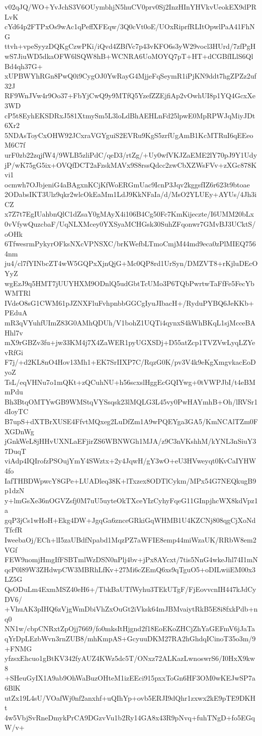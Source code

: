 v02qJQ/WO+YvJchS3V6OUymbhjN5huCV0prv0Sj2InzHInYHVkvUeokEX9dPRLvK
cYd64p2FTPxOs9wAc1qPeffXFEqw/3Q0cVt0oE/UOxRiprfRLItOpwlPaA41FhNG
ttvh+vpeSyyzDQKgCzwPKi/iQvd4ZBfVc7p43vKFO6s3yW29vocl3HUrd/7zfPgH
wS7JiuWD5dkaOFW6lSQW8hB+WCNRA6UoMOYQ7pT+HT+dCGBfILlS6QlBd4qh37G+
xUPBWYhRGn8PwQ0i9CygOJ0YwRayG4MjjeFqSeymR1iPjKN9ddt7hgZPZz2uf32J
RF9WnJVw4r9Oo37+FbYjCwQ9y9MTfQ5YzefZZEjfiAp2vOwhUI8p1YQ4GcxXe3WD
cP5t8EyhEKSDRxJ581XtmySm5L3loLdBhAEHLnFd25lpwE0MpRPWJqMiyJDt6Xr2
5NDAsToyCxOHW92JCxraVGYguiS2EVRu9KgS5zrfUgAmB1KcMTRuI6qEEeoM6C7f
urF0zb22zqjfW4/9WLB5zliPdC/qeD3/rtZg/+Uy0wfVKJZaEME2lY70pJ9Y1Udy
jP/wK75gG5ix+OVQfDCT2aFzskMAVx9S8rssQdcc2zwCbXZWsFVv+zXGc878Kvi1
ocmwh7OJbjeniG4aBAgxnKCjKfWoERGmUac9IcnP3Jqv2kggsfIZ6r623t9btoae
2ODabsIKT3Ulz9qkr2wlcOkEaMm1LdJ9KkNFaIa/d/MsO2YLUEy+AYUs/4Jh3iCZ
x7Z7t7EgIUahbnQlC1dZsaY0gMAyX4i106B4Cg50Fc7KmKijeczte/I6UMM20bLx
0vVfywQuzcbaF/UqNLXMcey0YXSyaMCHGsk30SuhZFqonwr7GMvBJ3UCktS/oOHk
6TfwesrmPykyrOFksNXcVPNSXC/brKWefbLTmoCmjM44md9eca0zPlMIEQ7564nm
ju4/cl7fYINbcZT4wW5GQPxXjnQjG+Mc0QP8rd1UrSyn/DMZVT8+rKjluDEcOYyZ
wgEzJ9q5HMT7jUUYHXM9ODnlQ5udGbtTcUMo3P6TQbPwrtwTaFfFe5FecYbWMTRl
IVdeO8sG1CWM61pJZNXFluFvhpnbbGGCgIyuJIbacH+/RyduPYBQ6JeKKb+PEduA
mR3qVYuhfUImZ83G0AMhQDUh/V1bohZ1UQTi4qynxS4kWhBKqL1sjMcceBAHhl7v
mX9rGBZv3fu+jw33KM4j7X4ZaWER1pyUGXSDj+D55atZcp1TVZVwLyqLZYevRfGi
F7j/+d2KL8nO4Hov13Mh1+EK7SrIIXP7C/RqzG0K/pv3V4k9eKgXmgvkacEoDyoZ
TsL/eqVHNu7o1mQKt+zQCuhNU+h56scxslHggEcGQIYwg+0tVWPJbI/t4eBMmPdu
Bh3BtqOMTYwGB9WMStqVYSsqsk23lMQLG3L45vy0PwHAYmhB+Oh/lRVSr1dIoyTC
B7upS+dXTBrXUSE4FfvtMQxeg2LuDfZm1A9wPQEYga3GA5/KmNCAlTZm0FXGDnWg
jGnkWeL8jHHvUXNLaEFjirZS6WBNWGh1MJA/z9C3nVKshhM/kYNL3nSiuY37DuqT
viAdp4IQIrofzPSOujYmY4SWztx+2y4JqwH/gY3wO+eU3HVweyqt0KvCaIYHW4fo
IafTHBDWpwcY8GPe+LUADleq38K+lTxzex8ODTlCykm/MPx54G7NEQkugB9p1dzN
y+lmGsXe36nOGVZsfj0M7uU5uyteOkTXceYIzCyhyFqeG11GInpjhcWX8kdVpz1a
gqP3jCs1wHoH+Ekg4DW+JgqGa6znceGRkiGqWHMB1U4KZCNj808qgCjXoNdTfcfR
IweebaOj/ECh+lI5zaUBdfNpabd1MqzPZ7aWFIE8emp44miWzaUK/RRbW8em2VGf
FEW9nomjHmgIfFSBTmlWzDSN0nPlj4bv+jPx8AYcxt/7tis5NnG4wkeJhl74I1mN
qcP0l89W3ZHdwpCW3MBRhLfKv+27Mi6cZEmQ6xs9qTguO5+oDILwiiEM00x3LZ5G
QsODuLm4ExmMSZ40eH6+/TbkBaUTfWyhu3TEkUTgF/FjEovvcnIH447kJdCyDV6/
+VhuAK3pIHQ6zVjgWmDbiVhZxOuGt2iVksk64mJBMvaiytRkB5E8i8fxkPdb+nq0
NN1w/cbpCNRxtZpOjj7669/fo0mksItHjgnd2f18EoEKoZHCjZhYaGEFmV6jJaTa
qYrDpLEzbWvn3rnZUB8/mhKmpAS+GcyuuDKM27RA2hGhdqICinoT35o3m/9+FNMG
yfzsxEhcuo1gBtKV342fyAUZ4KWz5dc5T/ONxz72ALKazLwnoswrS6/I0HxX9kw8
+SHeuGyIX1A9ab9OhWaBuzOHteM1izEEci915pxxToGn6HF3OM0wKEJwSP7a6BlK
utZx19L4sU/VOafWj0nf2anxhf+uQIhYp+ovb5ERJI9dQhr1zxwx2kE9pTE9DKHt
4w5VbjSvRneDmykPrCA9DGzvVu1b2Ry14GA8x43R9pNvq+fuhTNgD+fo5EGqW/v+
